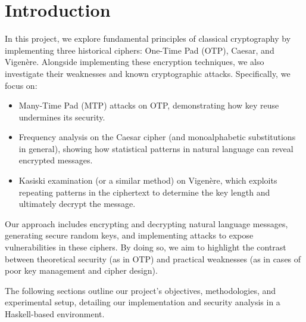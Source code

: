 \section{Introduction}
In this project, we explore fundamental principles of classical cryptography by implementing three historical ciphers: One-Time Pad (OTP), Caesar, and Vigenère. 
Alongside implementing these encryption techniques, we also investigate their weaknesses and known cryptographic attacks. 
Specifically, we focus on:

\begin{itemize}
    \item Many-Time Pad (MTP) attacks on OTP, demonstrating how key reuse undermines its security.
    \item Frequency analysis on the Caesar cipher (and monoalphabetic substitutions in general), 
    showing how statistical patterns in natural language can reveal encrypted messages.
    \item Kasiski examination (or a similar method) on Vigenère, 
    which exploits repeating patterns in the ciphertext to determine the key length and ultimately decrypt the message.
\end{itemize}

Our approach includes encrypting and decrypting natural language messages, generating secure random keys, 
and implementing attacks to expose vulnerabilities in these ciphers. 
By doing so, we aim to highlight the contrast between theoretical security (as in OTP) 
and practical weaknesses (as in cases of poor key management and cipher design).

The following sections outline our project’s objectives, methodologies, and experimental setup, 
detailing our implementation and security analysis in a Haskell-based environment.
